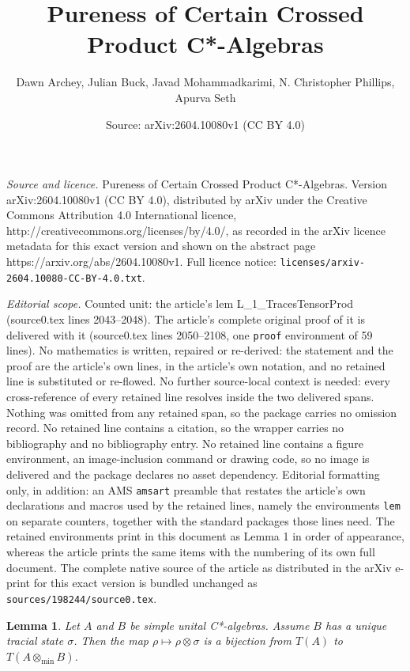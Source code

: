 \documentclass[10pt,a4paper]{amsart}
\title{Pureness of Certain Crossed Product C*-Algebras}
\author{Dawn Archey, Julian Buck, Javad Mohammadkarimi, N. Christopher Phillips, Apurva Seth}
\date{Source: arXiv:2604.10080v1 (CC BY 4.0)}
\newtheorem{lem}{Lemma}
\newcommand{\sm}{\sigma}
\begin{document}
\maketitle

\noindent\emph{Source and licence.} Pureness of Certain Crossed Product C*-Algebras. Version arXiv:2604.10080v1 (CC BY 4.0), distributed by arXiv under the Creative Commons Attribution 4.0 International licence, http://creativecommons.org/licenses/by/4.0/, as recorded in the arXiv licence metadata for this exact version and shown on the abstract page https://arxiv.org/abs/2604.10080v1. Full licence notice: \texttt{licenses/arxiv-2604.10080-CC-BY-4.0.txt}.\par\smallskip

\noindent\textit{Editorial scope.} Counted unit: the article's lem L\_1\_TracesTensorProd (source0.tex lines 2043--2048). The article's complete original proof of it is delivered with it (source0.tex lines 2050--2108, one \texttt{proof} environment of 59 lines). No mathematics is written, repaired or re-derived: the statement and the proof are the article's own lines, in the article's own notation, and no retained line is substituted or re-flowed.  No further source-local context is needed: every cross-reference of every retained line resolves inside the two delivered spans.  Nothing was omitted from any retained span, so the package carries no omission record.  No retained line contains a citation, so the wrapper carries no bibliography and no bibliography entry.  No retained line contains a figure environment, an image-inclusion command or drawing code, so no image is delivered and the package declares no asset dependency.  Editorial formatting only, in addition: an AMS \texttt{amsart} preamble that restates the article's own declarations and macros used by the retained lines, namely the environments \texttt{lem} on separate counters, together with the standard packages those lines need.  The retained environments print in this document as Lemma 1 in order of appearance, whereas the article prints the same items with the numbering of its own full document.  The complete native source of the article as distributed in the arXiv e-print for this exact version is bundled unchanged as \texttt{sources/198244/source0.tex}.
\begin{lem}\label{L_1_TracesTensorProd}
Let $A$ and $B$ be simple unital C*-algebras.
Assume $B$ has a unique tracial state $\sm$.
Then the map $\rho \mapsto \rho \otimes \sm$
is a bijection from $T(A)$ to $T(A \otimes_{\min} B)$.
\end{lem}
\end{document}
